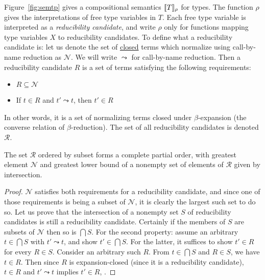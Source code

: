 \documentclass{article}
\begin{document}
Figure~\ref{fig:semtp} gives a compositional semantics
$\llbracket T \rrbracket_\rho$ for types.  The function $\rho$ gives the
interpretations of free type variables in $T$.  Each free type
variable is interpreted as a \emph{reducibility candidate}, and write
$\rho$ only for functions mapping type variables $X$ to reducibility
candidates.  To define what a reducibility candidate is: let us denote
the set of \underline{closed} terms which normalize using call-by-name
reduction as $\mathcal{N}$.  We will write $\leadsto$ for call-by-name
reduction. Then a reducibility candidate $R$ is a set of terms
satisfying the following requirements:
\begin{itemize}
\item $R \subseteq \mathcal{N}$
\item If $t\in R$ and $t'\leadsto t$, then $t'\in R$
\end{itemize}
In other words, it is a set of normalizing terms closed under $\beta$-expansion (the converse relation
of $\beta$-reduction).  The set of all reducibility candidates is denoted $\mathcal{R}$.

\vspace{0.25cm}

\begin{lemma}
  The set $\mathcal{R}$ ordered by subset forms a complete partial
  order, with greatest element $\mathcal{N}$ and greatest lower bound
  of a nonempty set of elements of $\mathcal{R}$ given by
  intersection.
\end{lemma}

\vspace{0.25cm}

\begin{proof}
  $\mathcal{N}$ satisfies both requirements for a reducibility
  candidate, and since one of those requirements is being a subset of
  $\mathcal{N}$, it is clearly the largest such set to do so.  Let us
  prove that the intersection of a nonempty set $S$ of reducibility
  candidates is still a reducibility candidate.  Certainly if the
  members of $S$ are subsets of $\mathcal{N}$ then so is $\bigcap S$.
  For the second property: assume an arbitrary $t\in\bigcap S$ with
  $t'\leadsto t$, and show $t'\in\bigcap S$.  For the latter, it
  suffices to show $t'\in R$ for every $R\in S$.  Consider an
  arbitrary such $R$.  From $t\in\bigcap S$ and $R \in S$, we have
  $t\in R$.  Then since $R$ is expansion-closed (since it is a reducibility
  candidate), $t \in R$ and
  $t'\leadsto t$ implies $t'\in R$, .
\end{proof}
\end{document}
